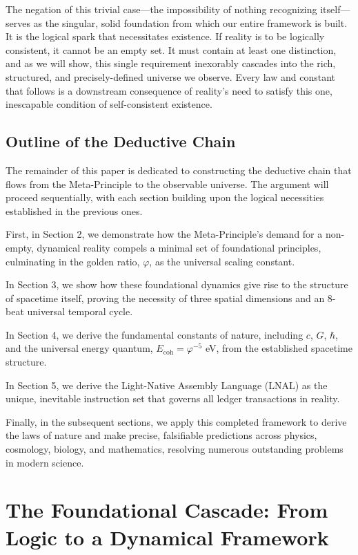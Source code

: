 \documentclass[11pt,a4paper]{article}
\begin{document}
The negation of this trivial case—the impossibility of nothing recognizing itself—serves as the singular, solid foundation from which our entire framework is built. It is the logical spark that necessitates existence. If reality is to be logically consistent, it cannot be an empty set. It must contain at least one distinction, and as we will show, this single requirement inexorably cascades into the rich, structured, and precisely-defined universe we observe. Every law and constant that follows is a downstream consequence of reality's need to satisfy this one, inescapable condition of self-consistent existence.

\subsection{Outline of the Deductive Chain}
The remainder of this paper is dedicated to constructing the deductive chain that flows from the Meta-Principle to the observable universe. The argument will proceed sequentially, with each section building upon the logical necessities established in the previous ones.

First, in Section 2, we demonstrate how the Meta-Principle's demand for a non-empty, dynamical reality compels a minimal set of foundational principles, culminating in the golden ratio, \(\varphi\), as the universal scaling constant.

In Section 3, we show how these foundational dynamics give rise to the structure of spacetime itself, proving the necessity of three spatial dimensions and an 8-beat universal temporal cycle.

In Section 4, we derive the fundamental constants of nature, including \(c\), \(G\), \(\hbar\), and the universal energy quantum, \(E_{\text{coh}} = \varphi^{-5}\) eV, from the established spacetime structure.

In Section 5, we derive the Light-Native Assembly Language (LNAL) as the unique, inevitable instruction set that governs all ledger transactions in reality.

Finally, in the subsequent sections, we apply this completed framework to derive the laws of nature and make precise, falsifiable predictions across physics, cosmology, biology, and mathematics, resolving numerous outstanding problems in modern science.

\section{The Foundational Cascade: From Logic to a Dynamical Framework}
\end{document}
